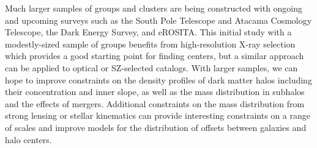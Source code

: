 Much larger samples of groups and clusters are being constructed with
ongoing and upcoming surveys such as the South Pole Telescope and
Atacama Cosmology Telescope, the Dark Energy Survey, and eROSITA. This
initial study with a modestly-sized sample of groups benefits from
high-resolution X-ray selection which provides a good starting point for finding
centers, but a similar approach can be applied to optical or SZ-selected
catalogs. With larger samples, we can hope to improve constraints on
the density profiles of dark matter halos including their
concentration and inner slope, as well as the mass distribution in
subhalos and the effects of mergers. Additional constraints on the
mass distribution from strong lensing or stellar kinematics can
provide interesting constraints on a range of scales and improve
models for the distribution of offsets between galaxies and halo
centers.
